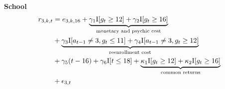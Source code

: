 \begin{frame}

\textbf{School}
\begin{align*}
r_{3,k,t} & = e_{3,k,16} + \underbrace{\gamma_{1}\mathrm{I}[g_t \geq 12] + \gamma_{2} \mathrm{I}[g_t \geq 16]}_{\text{monetary and psychic cost}} \\
         & + \underbrace{\gamma_{3} \mathrm{I}[a_{t -1} \neq 3, g_t \leq 11]  + \gamma_{4} \mathrm{I}[a_{t -1} \neq 3, g_t \geq 12]}_{\text{reenrollment cost}}  \\
         & + \gamma_{5} (t - 16) + \gamma_{6} \mathrm{I}[t \le 18] + \underbrace{\kappa_{1}\mathrm{I}[g_t \geq 12] + \kappa_{2} \mathrm{I}[g_t \geq 16]}_{\text{common returns}} \\
         & + \epsilon_{3,t}
\end{align*}
\end{frame}

